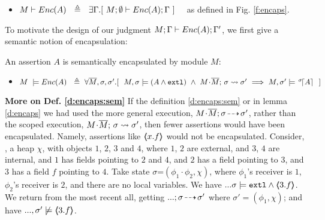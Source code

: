  

\begin{definition} $~$ \\
\label{d:encaps:sytactic}
\begin{itemize}
\item 
$M \vdash {\ensuremath Enc( A )}  \ \   \triangleq  \ \  \exists \Gamma.[\ M; \emptyset \vdash {\ensuremath Enc( A )}; \Gamma\ ]$ \ \  as defined in Fig. \ref{f:encaps}.
 \end{itemize}
  \end{definition}

To motivate the design of our judgment $M; \Gamma \vdash {\ensuremath Enc( A )}; \Gamma'$,  we first give a semantic notion of encapsulation:


\begin{definition}  An assertion $A$ is semantically encapsulated by module $M$:
\label{d:encaps:sem}

\begin{itemize}
\item
$
    M\ \models \encaps{A}\ \   \triangleq  \   
     \forall \Mtwo, \sigma, \sigma'.[   \ \  \satisfiesA{M}{\sigma}{(A  \wedge \externalexec)}\  \wedge\ { \leadstoBounded {M\madd\Mtwo}  {\sigma}{\sigma'}} %
        \  \Longrightarrow\  
    {M},{\sigma'}\models {\as \sigma A} \ \  ]
  $
\end{itemize}
\end{definition}

\noindent
\textbf{More on Def. \ref{d:encaps:sem}} {If the definition \ref{d:encaps:sem} or in lemma \ref{d:encaps} we had used the more general execution, $M\!\cdot\!\overline{M};\sigma\! \dashrightarrow\! {\sigma'}$, rather than the scoped execution,  $M\!\cdot\!\overline{M};\, {\sigma} \rightsquigarrow \sigma'$,
 then fewer assertions would have been encapsulated.}
Namely, assertions like    $\langle\!\!\langle x.f \rangle\!\!\rangle$ would not be encapsulated.
Consider, \eg, a heap $\chi$, with objects $1$, $2$, $3$ and $4$, where  $1$, $2$ are external, and $3$, $4$ are internal, and  $1$ has fields pointing to $2$ and $4$, and $2$ has a field pointing to $3$, and $3$ has a field $f$ pointing to $4$. Take  state $\sigma$=$(\phi_1\!\cdot\!\phi_2,\chi)$, where $\phi_1$'s receiver is $1$,  $\phi_2$'s receiver is $2$,   and there are no local variables. 
We have  $...\sigma\models \mbox{\normalfont{\texttt{extl}}} \wedge \langle\!\!\langle 3.f \rangle\!\!\rangle$. 
We  return from the most recent all, 
getting  $...;\sigma\! \dashrightarrow\! {\sigma'}$ where $\sigma'=(\phi_1,\chi)$; and have   $...,\sigma'\not\models  \langle\!\!\langle 3.f \rangle\!\!\rangle$.

